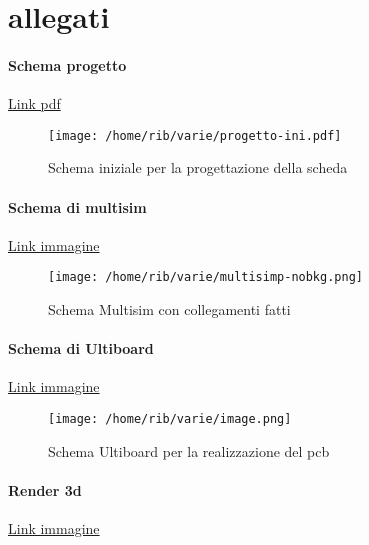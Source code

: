 \documentclass{article}
\begin{document}
\section{allegati} 

\paragraph{Schema progetto}
\href{https://drive.google.com/file/d/1qK_MUvGxWjfc9fLc7l3a6s5mL5L6D6fg/view?usp=sharing}{Link pdf}
\begin{figure}[H]
   \centering
        \texttt{[image: /home/rib/varie/progetto-ini.pdf]}
       \label{prog}
       \caption{Schema iniziale per la progettazione della scheda}
\end{figure}

\paragraph{Schema di multisim}
\href{https://drive.google.com/file/d/1VOPnspiu-4T2ZOR6uaUWNH1DUEd0fUcg/view?usp=sharing}{Link immagine}
\begin{figure}[H]
   \centering
        \texttt{[image: /home/rib/varie/multisimp-nobkg.png]}
       \label{multisim}
       \caption{Schema Multisim con collegamenti fatti}
\end{figure}

\paragraph{Schema di Ultiboard}
\href{https://drive.google.com/file/d/1ZlJ_AIXvgzdlvAawX5noBu48i03zm5dP/view?usp=sharing}{Link immagine}
\begin{figure}[H]
    \centering
        \texttt{[image: /home/rib/varie/image.png]}
        \label{ultiabroad}
        \caption{Schema Ultiboard per la realizzazione del pcb}
\end{figure}

\paragraph{Render 3d}
\href{https://drive.google.com/file/d/1EMIzjUSU50ij58dLTjCctJGQM4YIgIii/view?usp=sharing}{Link immagine}
\end{document}
